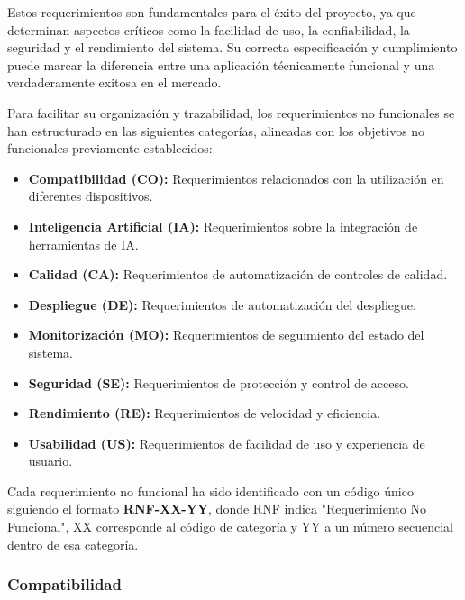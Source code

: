 Estos requerimientos son fundamentales para el éxito del proyecto, ya que determinan aspectos críticos como la facilidad de uso, la confiabilidad, la seguridad y el rendimiento del sistema. Su correcta especificación y cumplimiento puede marcar la diferencia entre una aplicación técnicamente funcional y una verdaderamente exitosa en el mercado.

Para facilitar su organización y trazabilidad, los requerimientos no funcionales se han estructurado en las siguientes categorías, alineadas con los objetivos no funcionales previamente establecidos:

\begin{itemize}
    \item \textbf{Compatibilidad (CO):} Requerimientos relacionados con la utilización en diferentes dispositivos.
    \item \textbf{Inteligencia Artificial (IA):} Requerimientos sobre la integración de herramientas de IA.
    \item \textbf{Calidad (CA):} Requerimientos de automatización de controles de calidad.
    \item \textbf{Despliegue (DE):} Requerimientos de automatización del despliegue.
    \item \textbf{Monitorización (MO):} Requerimientos de seguimiento del estado del sistema.
    \item \textbf{Seguridad (SE):} Requerimientos de protección y control de acceso.
    \item \textbf{Rendimiento (RE):} Requerimientos de velocidad y eficiencia.
    \item \textbf{Usabilidad (US):} Requerimientos de facilidad de uso y experiencia de usuario.
\end{itemize}

Cada requerimiento no funcional ha sido identificado con un código único siguiendo el formato \textbf{RNF-XX-YY}, donde RNF indica "Requerimiento No Funcional", XX corresponde al código de categoría y YY a un número secuencial dentro de esa categoría.

\subsubsection*{Compatibilidad}


